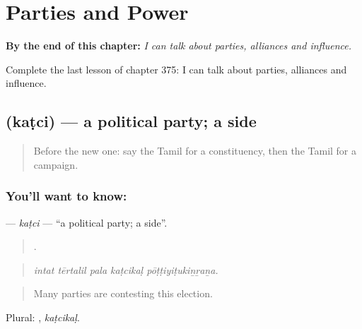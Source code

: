 
\chapter{Parties and Power}
\label{ch:ta-parties-and-power}

\begin{chapteropening}
\textbf{By the end of this chapter:} \emph{I can talk about parties, alliances and influence.}

Complete the last lesson of chapter 375: I can talk about parties, alliances and influence.
\end{chapteropening}

\section[\texorpdfstring{\ta{கட்சி} (kaṭci)}{கட்சி (kaṭci)}]{ (kaṭci) — a political party; a side}

\label{lesson:TA-C375-katci}



\begin{quote}
Before the new one: say the Tamil for a constituency, then the Tamil for a campaign.
\end{quote}

\subsection*{You'll want to know: }
\textbf{} — \emph{kaṭci} — \textquotedblleft{}a political party; a side\textquotedblright{}.

\begin{quote}
    .
\end{quote}

\begin{quote}
\emph{intat tērtalil pala kaṭcikaḷ pōṭṭiyiṭukiṉṟaṉa.}
\end{quote}

\begin{quote}
Many parties are contesting this election.
\end{quote}

Plural: , \emph{kaṭcikaḷ}.

